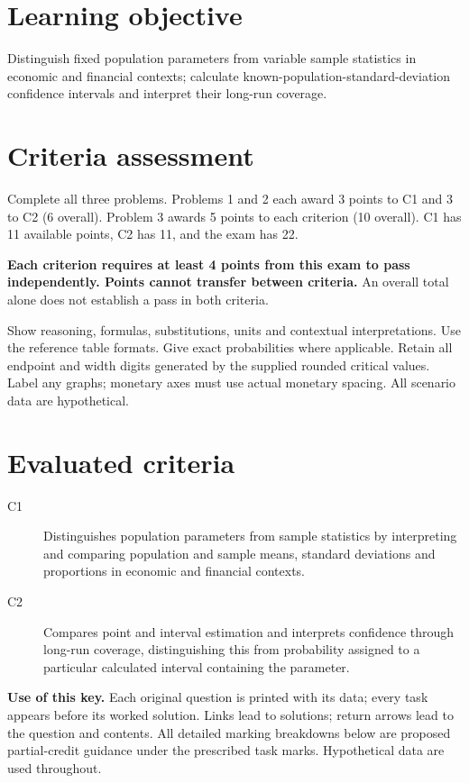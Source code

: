 \maketitle
\setcounter{tocdepth}{1}
\label{toc}\tableofcontents
\section*{Learning objective}
Distinguish fixed population parameters from variable sample statistics in economic and financial contexts; calculate known-population-standard-deviation confidence intervals and interpret their long-run coverage.
\section*{Criteria assessment}
Complete all three problems. Problems 1 and 2 each award 3 points to C1 and 3 to C2 (6 overall). Problem 3 awards 5 points to each criterion (10 overall). C1 has 11 available points, C2 has 11, and the exam has 22.

\textbf{Each criterion requires at least 4 points from this exam to pass independently. Points cannot transfer between criteria.} An overall total alone does not establish a pass in both criteria.

Show reasoning, formulas, substitutions, units and contextual interpretations. Use the reference table formats. Give exact probabilities where applicable. Retain all endpoint and width digits generated by the supplied rounded critical values. Label any graphs; monetary axes must use actual monetary spacing. All scenario data are hypothetical.
\section*{Evaluated criteria}
\begin{description}
\item[C1] Distinguishes population parameters from sample statistics by interpreting and comparing population and sample means, standard deviations and proportions in economic and financial contexts.
\item[C2] Compares point and interval estimation and interprets confidence through long-run coverage, distinguishing this from probability assigned to a particular calculated interval containing the parameter.
\end{description}
\clearpage
\textbf{Use of this key.} Each original question is printed with its data; every task appears before its worked solution. Links lead to solutions; return arrows lead to the question and contents. All detailed marking breakdowns below are proposed partial-credit guidance under the prescribed task marks. Hypothetical data are used throughout.
